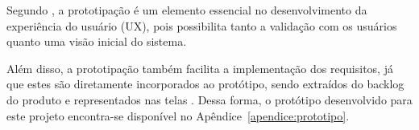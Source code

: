 

Segundo , a prototipação é um elemento essencial no desenvolvimento da experiência do usuário (UX), pois possibilita tanto a validação com os usuários quanto uma visão inicial do sistema.

Além disso, a prototipação também facilita a implementação dos requisitos, já que estes são diretamente incorporados ao protótipo, sendo extraídos do backlog do produto e representados nas telas \cite{vazquez2016engenharia}. Dessa forma, o protótipo desenvolvido para este projeto encontra-se disponível no Apêndice~\ref{apendice:prototipo}.
